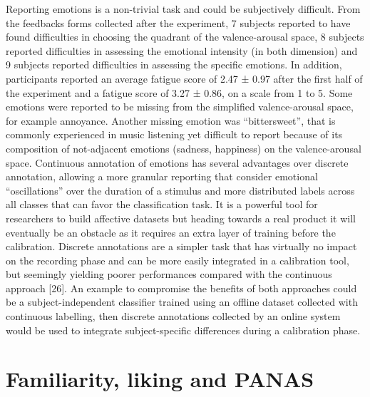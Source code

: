 Reporting emotions is a non-trivial task and could be subjectively difficult. From the feedbacks forms collected after the experiment, 7 subjects reported to have found difficulties in choosing the quadrant of the valence-arousal space, 8 subjects reported difficulties in assessing the emotional intensity (in both dimension) and 9 subjects reported difficulties in assessing the specific emotions. In addition, participants reported an average fatigue score of 2.47 ± 0.97 after the first half of the experiment and a fatigue score of 3.27 ± 0.86, on a scale from 1 to 5. Some emotions were reported to be missing from the simplified valence-arousal space, for example annoyance. Another missing emotion was “bittersweet”, that is commonly experienced in music listening yet difficult to report because of its composition of not-adjacent emotions (sadness, happiness) on the valence-arousal space. Continuous annotation of emotions has several advantages over discrete annotation, allowing a more granular reporting that consider emotional “oscillations” over the duration of a stimulus and more distributed labels across all classes that can favor the classification task.  It is a powerful tool for researchers to build affective datasets but heading towards a real product it will eventually be an obstacle as it requires an extra layer of training before the calibration. Discrete annotations are a simpler task that has virtually no impact on the recording phase and can be more easily integrated in a calibration tool, but seemingly yielding poorer performances compared with the continuous approach [26]. An example to compromise the benefits of both approaches could be a subject-independent classifier trained using an offline dataset collected with continuous labelling, then discrete annotations collected by an online system would be used to integrate subject-specific differences during a calibration phase.

\section{Familiarity, liking and PANAS}

